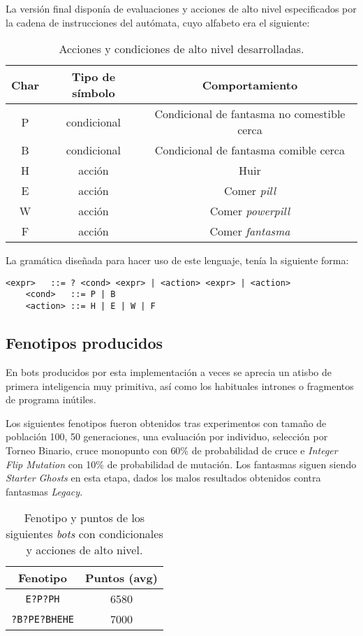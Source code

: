 \blankline

La versión final disponía de evaluaciones y acciones de alto nivel especificados por la cadena de instrucciones del autómata, cuyo alfabeto era el siguiente:
\begin{table}[H]
\centering
\begin{tabular}{ccc}
\hline
\textbf{Char} & \textbf{Tipo de símbolo} & \textbf{Comportamiento}                     \\ \hline
P             & condicional              & Condicional de fantasma no comestible cerca \\
B             & condicional              & Condicional de fantasma comible cerca       \\
H             & acción                   & Huir                                        \\
E             & acción                   & Comer \textit{pill}                         \\
W             & acción                   & Comer \textit{powerpill}                    \\
F             & acción                   & Comer \textit{fantasma}                     \\ \hline
\end{tabular}
\caption{Acciones y condiciones de alto nivel desarrolladas.}
\end{table}

La gramática diseñada para hacer uso de este lenguaje, tenía la siguiente forma:
\begin{lstlisting}[caption=Gramática con acciones de alto nivel.]
    <expr>   ::= ? <cond> <expr> | <action> <expr> | <action>
    <cond>   ::= P | B
    <action> ::= H | E | W | F
\end{lstlisting}

\subsection{Fenotipos producidos}
En bots producidos por esta implementación a veces se aprecia un atisbo de primera inteligencia muy primitiva, así como los habituales intrones o fragmentos de programa inútiles.
 
Los siguientes fenotipos fueron obtenidos tras experimentos con tamaño de población 100, 50 generaciones, una evaluación por individuo, selección por Torneo Binario, cruce monopunto con 60\% de probabilidad de cruce e \textit{Integer Flip Mutation} con 10\% de probabilidad de mutación. Los fantasmas siguen siendo \textit{Starter Ghosts} en esta etapa, dados los malos resultados obtenidos contra fantasmas \textit{Legacy}.
\begin{table}[H]
\centering
\begin{tabular}{cc}
\hline
\textbf{Fenotipo} & \textbf{Puntos (avg)} \\ \hline
\texttt{E?P?PH}          & 6580                  \\
\texttt{?B?PE?BHEHE}          & 7000                  \\ \hline
\end{tabular}
\caption{Fenotipo y puntos de los siguientes \textit{bots} con condicionales y acciones de alto nivel.}
\end{table}

